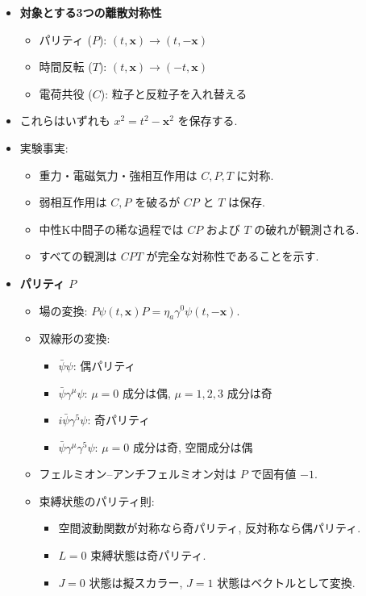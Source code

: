 \documentclass[a4paper,12pt]{article}
\begin{document}
\begin{itemize}
  \item \textbf{対象とする3つの離散対称性}
  \begin{itemize}
    \item パリティ ($P$): $(t,\mathbf{x}) \to (t,-\mathbf{x})$
    \item 時間反転 ($T$): $(t,\mathbf{x}) \to (-t,\mathbf{x})$
    \item 電荷共役 ($C$): 粒子と反粒子を入れ替える
  \end{itemize}
  \item これらはいずれも $x^2=t^2-\mathbf{x}^2$ を保存する.
  \item 実験事実:
  \begin{itemize}
    \item 重力・電磁気力・強相互作用は $C,P,T$ に対称.
    \item 弱相互作用は $C,P$ を破るが $CP$ と $T$ は保存.
    \item 中性K中間子の稀な過程では $CP$ および $T$ の破れが観測される.
    \item すべての観測は $CPT$ が完全な対称性であることを示す.
  \end{itemize}

  \item \textbf{パリティ $P$}
  \begin{itemize}
    \item 場の変換: $P\psi(t,\mathbf{x})P = \eta_a \gamma^0 \psi(t,-\mathbf{x})$.
    \item 双線形の変換:
    \begin{itemize}
      \item $\bar{\psi}\psi$: 偶パリティ
      \item $\bar{\psi}\gamma^\mu\psi$: $\mu=0$ 成分は偶, $\mu=1,2,3$ 成分は奇
      \item $i\bar{\psi}\gamma^5\psi$: 奇パリティ
      \item $\bar{\psi}\gamma^\mu\gamma^5\psi$: $\mu=0$ 成分は奇, 空間成分は偶
    \end{itemize}
    \item フェルミオン–アンチフェルミオン対は $P$ で固有値 $-1$.
    \item 束縛状態のパリティ則:
    \begin{itemize}
      \item 空間波動関数が対称なら奇パリティ, 反対称なら偶パリティ.
      \item $L=0$ 束縛状態は奇パリティ.
      \item $J=0$ 状態は擬スカラー, $J=1$ 状態はベクトルとして変換.
    \end{itemize}
  \end{itemize}


\end{itemize}
\end{document}

